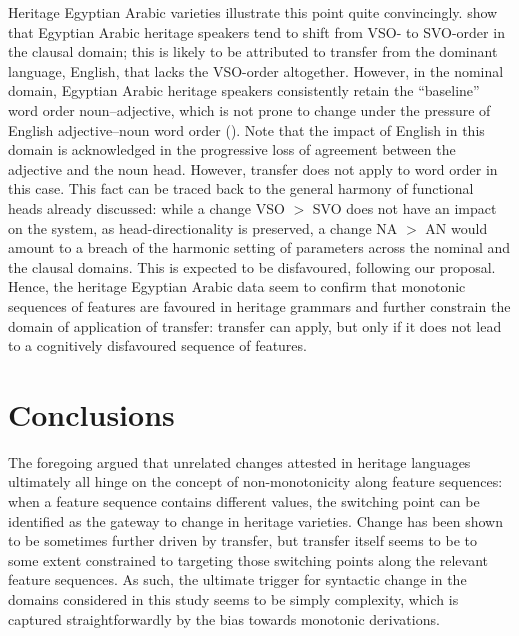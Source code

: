 \documentclass[output=paper]{langscibook}
\begin{document}
Heritage Egyptian Arabic varieties illustrate this point quite convincingly. \citet{AlbiriniEtAl2011} show that Egyptian Arabic heritage speakers tend to shift from VSO- to SVO-order in the clausal domain; this is likely to be attributed to transfer from the dominant language, English, that lacks the VSO-order altogether. However, in the nominal domain, Egyptian Arabic heritage speakers consistently retain the ``baseline'' word order noun--adjective, which is not prone to change under the pressure of English adjective--noun word order (\citealt{Albirini2014}). Note that the impact of English in this domain is acknowledged in the progressive loss of agreement between the adjective and the noun head. However, transfer does not apply to word order in this case. This fact can be traced back to the general harmony of functional heads already discussed: while a change VSO $>$ SVO does not have an impact on the system, as head-directionality is preserved, a change NA $>$ AN would amount to a breach of the harmonic setting of parameters across the nominal and the clausal domains. This is expected to be disfavoured, following our proposal. Hence, the heritage Egyptian Arabic data seem to confirm that monotonic sequences of features are favoured in heritage grammars and further constrain the domain of application of transfer: transfer can apply, but only if it does not lead to a cognitively disfavoured sequence of features.

\section{Conclusions\label{sec:concl}} 

The foregoing argued that unrelated changes attested in heritage languages ultimately all hinge on the concept of non-monotonicity along feature sequences: when a feature sequence contains different values, the switching point can be identified as the gateway to change in heritage varieties. Change has been shown to be sometimes further driven by transfer, but transfer itself seems to be to some extent constrained to targeting those switching points along the relevant feature sequences. As such, the ultimate trigger for syntactic change in the domains considered in this study seems to be simply complexity, which is captured straightforwardly by the bias towards monotonic derivations. 
\end{document}
